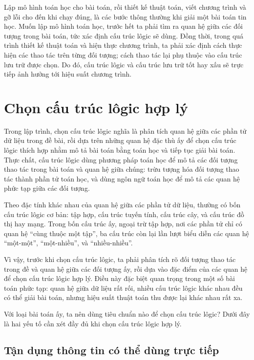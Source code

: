 \documentclass[11pt]{article}
\begin{document}
Lập mô hình toán học cho bài toán, rồi thiết kế thuật toán, viết chương trình
và gỡ lỗi cho đến khi chạy đúng, là các bước thông thường khi giải một bài
toán tin học. Muốn lập mô hình toán học, trước hết ta phải tìm ra quan hệ giữa
các đối tượng trong bài toán, tức xác định cấu trúc lôgic sẽ dùng. Đồng thời,
trong quá trình thiết kế thuật toán và hiện thực chương trình, ta phải xác
định cách thực hiện các thao tác trên từng đối tượng; cách thao tác lại phụ
thuộc vào cấu trúc lưu trữ được chọn. Do đó, cấu trúc lôgic và cấu trúc lưu
trữ tốt hay xấu sẽ trực tiếp ảnh hưởng tới hiệu suất chương trình.

\section{Chọn cấu trúc lôgic hợp lý}

Trong lập trình, chọn cấu trúc lôgic nghĩa là phân tích quan hệ giữa các phần
tử dữ liệu trong đề bài, rồi dựa trên những quan hệ đặc thù ấy để chọn cấu
trúc lôgic thích hợp nhằm mô tả bài toán bằng toán học và tiếp tục giải bài
toán. Thực chất, cấu trúc lôgic dùng phương pháp toán học để mô tả các đối
tượng thao tác trong bài toán và quan hệ giữa chúng: trừu tượng hóa đối tượng
thao tác thành phần tử toán học, và dùng ngôn ngữ toán học để mô tả các quan
hệ phức tạp giữa các đối tượng.

Theo đặc tính khác nhau của quan hệ giữa các phần tử dữ liệu, thường có bốn
cấu trúc lôgic cơ bản: tập hợp, cấu trúc tuyến tính, cấu trúc cây, và cấu trúc
đồ thị hay mạng. Trong bốn cấu trúc ấy, ngoại trừ tập hợp, nơi các phần tử chỉ
có quan hệ ``cùng thuộc một tập'', ba cấu trúc còn lại lần lượt biểu diễn các
quan hệ ``một-một'', ``một-nhiều'', và ``nhiều-nhiều''.

Vì vậy, trước khi chọn cấu trúc lôgic, ta phải phân tích rõ đối tượng thao tác
trong đề và quan hệ giữa các đối tượng ấy, rồi dựa vào đặc điểm của các quan
hệ để chọn cấu trúc lôgic hợp lý. Điều này đặc biệt quan trọng trong một số
bài toán phức tạp: quan hệ giữa dữ liệu rất rối, nhiều cấu trúc lôgic khác
nhau đều có thể giải bài toán, nhưng hiệu suất thuật toán thu được lại khác
nhau rất xa.

Với loại bài toán ấy, ta nên dùng tiêu chuẩn nào để chọn cấu trúc lôgic? Dưới
đây là hai yếu tố cần xét đầy đủ khi chọn cấu trúc lôgic hợp lý.

\subsection{Tận dụng thông tin có thể dùng trực tiếp}
\end{document}
